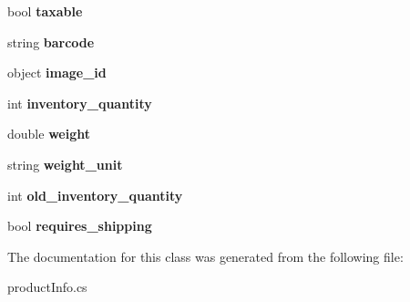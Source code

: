 \begin{DoxyCompactItemize}
\item 
\mbox{\label{class_nexus_1_1_variant_aa6ac01ed0440db4150871cf934e3612f}} 
bool {\bfseries taxable}
\item 
\mbox{\label{class_nexus_1_1_variant_a0b7a058476308f8f8ff30b95b0920cec}} 
string {\bfseries barcode}
\item 
\mbox{\label{class_nexus_1_1_variant_a9cc119e26aa72b42e70b8e7c83039ad8}} 
object {\bfseries image\+\_\+id}
\item 
\mbox{\label{class_nexus_1_1_variant_a353b3cf1dd4d765122352ee8b130d9f0}} 
int {\bfseries inventory\+\_\+quantity}
\item 
\mbox{\label{class_nexus_1_1_variant_a3d3a28aac69b184bd62630eeef8ce0c1}} 
double {\bfseries weight}
\item 
\mbox{\label{class_nexus_1_1_variant_a73393e4c64f4aa65d613b5d81be3ea4d}} 
string {\bfseries weight\+\_\+unit}
\item 
\mbox{\label{class_nexus_1_1_variant_ae94b0a8f167290bba463d2a326baa55c}} 
int {\bfseries old\+\_\+inventory\+\_\+quantity}
\item 
\mbox{\label{class_nexus_1_1_variant_ad6e3fccfbd0a847b6e1d7fa5442ca5e7}} 
bool {\bfseries requires\+\_\+shipping}
\end{DoxyCompactItemize}


The documentation for this class was generated from the following file\+:\begin{DoxyCompactItemize}
\item 
product\+Info.\+cs\end{DoxyCompactItemize}
